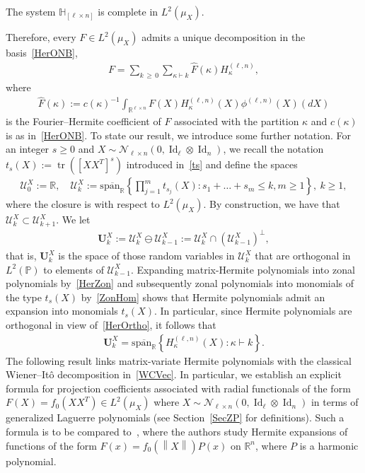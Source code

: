 \documentclass[AHL,Unicode,longabstracts,published]{cedram}
\DeclareMathOperator{\Id}{Id}
\DeclareMathOperator{\Tr}{tr}
\newcommand{\scN}{\mathscr{N}}
\newcommand{\spanl}{\mathrm{span}}
\newcommand{\bfU}{\mathbf{U}}
\newcommand{\clU}{\mathcal{U}}
\newcommand{\R}{\mathbb{R}}
\newcommand{\bbH}{\mathbb{H}}
\newcommand{\Prob}{\mathbb{P}}
\newcommand{\norm}[1]{\left\lVert#1\right\rVert}
\begin{document}
\begin{prop}\label{Prop:Complete}
The system $\bbH_{[\ell\times n]}$ is complete in $L^2(\mu_X)$.
\end{prop}

Therefore, every $F \in L^2(\mu_X)$ admits a unique decomposition in the basis~\eqref{HerONB},
\begin{gather}\label{Decomp}
F = \sum_{k\,\geq\,0} \sum_{ \kappa \vdash k} \widehat{F}(\kappa) H_{\kappa}^{(\ell,n)},
\end{gather}
where
\begin{gather}\label{Coeff}
\widehat{F}(\kappa) := c(\kappa)^{-1} \int_{\R^{\ell\times n}} F(X) H_{\kappa}^{(\ell,n)}(X) \phi^{(\ell,n)}(X)(dX)
\end{gather}
is the Fourier--Hermite coefficient of $F$ associated with the partition $\kappa$ and $c(\kappa)$ is as in~\eqref{HerONB}. To state our result, we introduce some further notation. For an integer $s\geq 0$ and $X \sim \scN_{\ell\times n}(0,\Id_{\ell}\otimes \Id_n)$, we recall the notation $ t_{s}(X) := \Tr{([XX^T]^s)} $ introduced in~\eqref{ts} and define the spaces
\begin{gather*}
\clU_0^X := \R, \quad \clU_k^X := \overline{\spanl_{\R}}\left\{ \prod_{j=1}^m t_{s_j}(X) : s_1+\ldots+s_m \leq k, m \geq 1\right\}, \ k\geq1,
\end{gather*}
where the closure is with respect to $L^2(\mu_X)$. By construction, we have that $ \clU_k^X \subset \clU_{k+1}^X$. We let
\begin{gather*}
\bfU_{k}^X:= \clU_k^X \ominus \clU_{k-1}^X := \clU_k^X \cap \left(\clU_{k-1}^X\right)^{\perp},
\end{gather*}
that is, $\bfU_k^X$ is the space of those random variables in $\clU_k^X$ that are orthogonal in $L^2(\Prob)$ to elements of $\clU_{k-1}^X$. Expanding matrix-Hermite polynomials into zonal polynomials by~\eqref{HerZon} and subsequently zonal polynomials into monomials of the type $t_s(X)$ by~\eqref{ZonHom} shows that Hermite polynomials admit an expansion into monomials $t_s(X)$. In particular, since Hermite polynomials are orthogonal in view of~\eqref{HerOrtho}, it follows that
\begin{gather*}
\bfU_k^X = \overline{\spanl_{\R}}\left\{ H_{\kappa}^{(\ell,n)}(X) : \kappa \vdash k \right\}.
\end{gather*}
The following result links matrix-variate Hermite polynomials with the classical Wiener--Itô decomposition in~\eqref{WCVec}. In particular, we establish an explicit formula for projection coefficients associated with radial functionals of the form $F(X)=f_0(XX^T)\in L^2(\mu_X)$ where $X\sim \scN_{\ell \times n}(0,\Id_{\ell}\otimes \Id_n)$ in terms of generalized Laguerre polynomials (see Section~\ref{SecZP} for definitions). Such a formula is to be compared to~\cite{Kochneff,Thangavelu}, where the authors study Hermite expansions of functions of the form $F(x)=f_0(\norm{X})P(x)$ on $\R^n$, where $P$ is a harmonic polynomial.
\end{document}
